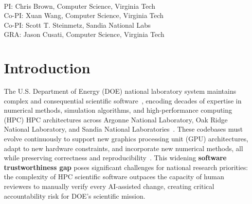 \documentclass{files/proposalnsf}
\begin{document}


\newpage
{}



\newpage
{}

\begin{center}
    \large{\proposalEighteen} \\ \vspace{0.5pt}
\footnotesize{PI: Chris Brown, Computer Science, Virginia Tech} \\
\footnotesize{Co-PI: Xuan Wang, Computer Science, Virginia Tech} \\
\footnotesize{Co-PI: Scott T. Steinmetz, Sandia National Labs} \\
\footnotesize{GRA: Jason Cusati, Computer Science, Virginia Tech}
\end{center}\vspace{-15pt}



\section{Introduction}
The U.S. Department of Energy (DOE) national laboratory system  maintains complex and consequential scientific software~\cite{perabytes}, encoding decades of expertise in numerical methods, simulation algorithms, and high-performance computing (HPC) HPC architectures across Argonne National Laboratory, Oak Ridge National Laboratory, and Sandia National Laboratories~\cite{perabytes}. These codebases must evolve continuously to support new graphics processing unit (GPU) architectures, adapt to new hardware constraints, and incorporate new numerical methods, all while preserving correctness and reproducibility~\cite{keahey2025report,pouchard2019computational}. This widening \textbf{software trustworthiness gap} poses significant challenges for national research priorities: the complexity of HPC scientific software outpaces the capacity of human reviewers to manually verify every AI-assisted change, creating critical accountability risk for DOE's scientific mission.
\end{document}
